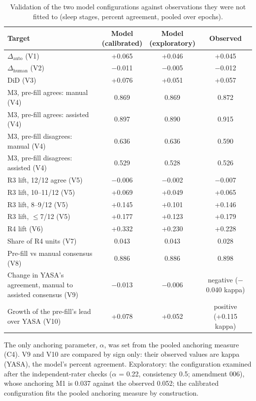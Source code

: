 \begin{table}[tbp]
\centering
\footnotesize
\caption{Validation of the two model configurations against observations they were not fitted to (sleep stages, percent agreement, pooled over epochs).}
\label{tab:validation}
\begin{adjustbox}{max width=\linewidth}
\begin{tabular}{lccc}
\toprule
Target & \makecell{Model\\(calibrated)} & \makecell{Model\\(exploratory)} & Observed \\
\midrule
$\Delta_{\mathrm{auto}}$ (V1) & +0.065 & +0.046 & +0.045 \\
$\Delta_{\mathrm{human}}$ (V2) & \ensuremath{-}0.011 & \ensuremath{-}0.005 & \ensuremath{-}0.012 \\
DiD (V3) & +0.076 & +0.051 & +0.057 \\
M3, pre-fill agrees: manual (V4) & 0.869 & 0.869 & 0.872 \\
M3, pre-fill agrees: assisted (V4) & 0.897 & 0.890 & 0.915 \\
M3, pre-fill disagrees: manual (V4) & 0.636 & 0.636 & 0.590 \\
M3, pre-fill disagrees: assisted (V4) & 0.529 & 0.528 & 0.526 \\
R3 lift, 12/12 agree (V5) & \ensuremath{-}0.006 & \ensuremath{-}0.002 & \ensuremath{-}0.007 \\
R3 lift, 10--11/12 (V5) & +0.069 & +0.049 & +0.065 \\
R3 lift, 8--9/12 (V5) & +0.145 & +0.101 & +0.146 \\
R3 lift, $\le$7/12 (V5) & +0.177 & +0.123 & +0.179 \\
R4 lift (V6) & +0.332 & +0.230 & +0.228 \\
Share of R4 units (V7) & 0.043 & 0.043 & 0.028 \\
Pre-fill vs manual consensus (V8) & 0.886 & 0.886 & 0.898 \\
Change in YASA's agreement, manual to assisted consensus (V9) & \ensuremath{-}0.013 & \ensuremath{-}0.006 & negative (\ensuremath{-}0.040 kappa) \\
Growth of the pre-fill's lead over YASA (V10) & +0.078 & +0.052 & positive (+0.115 kappa) \\
\bottomrule
\end{tabular}
\end{adjustbox}
\par\smallskip
\begin{minipage}{0.95\linewidth}\footnotesize The only anchoring parameter, $\alpha$, was set from the pooled anchoring measure (C4). V9 and V10 are compared by sign only: their observed values are kappa (YASA), the model's percent agreement. Exploratory: the configuration examined after the independent-rater checks ($\alpha$ = 0.22, consistency 0.5; amendment 006), whose anchoring M1 is 0.037 against the observed 0.052; the calibrated configuration fits the pooled anchoring measure by construction.\end{minipage}
\end{table}
